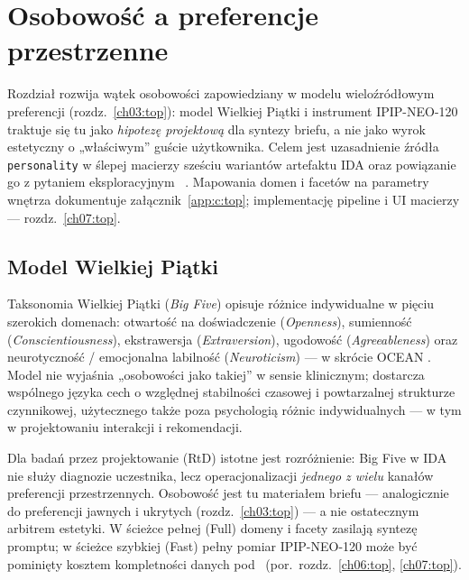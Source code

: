 \chapter{Osobowość a preferencje przestrzenne}
\label{ch05:top}

Rozdział rozwija wątek osobowości zapowiedziany w modelu wieloźródłowym preferencji (rozdz.~\ref{ch03:top}): model Wielkiej Piątki i instrument IPIP-NEO-120 traktuje się tu jako \emph{hipotezę projektową} dla syntezy briefu, a nie jako wyrok estetyczny o „właściwym” guście użytkownika.
Celem jest uzasadnienie źródła \texttt{personality} w ślepej macierzy sześciu wariantów artefaktu IDA oraz powiązanie go z pytaniem eksploracyjnym~ \parencite{idaPlatform2026}.
Mapowania domen i facetów na parametry wnętrza dokumentuje załącznik~\ref{app:c:top}; implementację pipeline i UI macierzy --- rozdz.~\ref{ch07:top}.

\section{Model Wielkiej Piątki}
\label{ch05:sec:bigfive}

Taksonomia Wielkiej Piątki (\emph{Big Five}) opisuje różnice indywidualne w pięciu szerokich domenach: otwartość na doświadczenie (\emph{Openness}), sumienność (\emph{Conscientiousness}), ekstrawersja (\emph{Extraversion}), ugodowość (\emph{Agreeableness}) oraz neurotyczność / emocjonalna labilność (\emph{Neuroticism}) --- w skrócie OCEAN \parencite{john2008bigfive}.
Model nie wyjaśnia „osobowości jako takiej” w sensie klinicznym; dostarcza wspólnego języka cech o względnej stabilności czasowej i powtarzalnej strukturze czynnikowej, użytecznego także poza psychologią różnic indywidualnych --- w tym w projektowaniu interakcji i rekomendacji.

Dla badań przez projektowanie (RtD) istotne jest rozróżnienie: Big Five w IDA nie służy diagnozie uczestnika, lecz operacjonalizacji \emph{jednego z wielu} kanałów preferencji przestrzennych.
Osobowość jest tu materiałem briefu --- analogicznie do preferencji jawnych i ukrytych (rozdz.~\ref{ch03:top}) --- a nie ostatecznym arbitrem estetyki.
W ścieżce pełnej (Full) domeny i facety zasilają syntezę promptu; w ścieżce szybkiej (Fast) pełny pomiar IPIP-NEO-120 może być pominięty kosztem kompletności danych pod~ (por.\ rozdz.~\ref{ch06:top}, \ref{ch07:top}).

